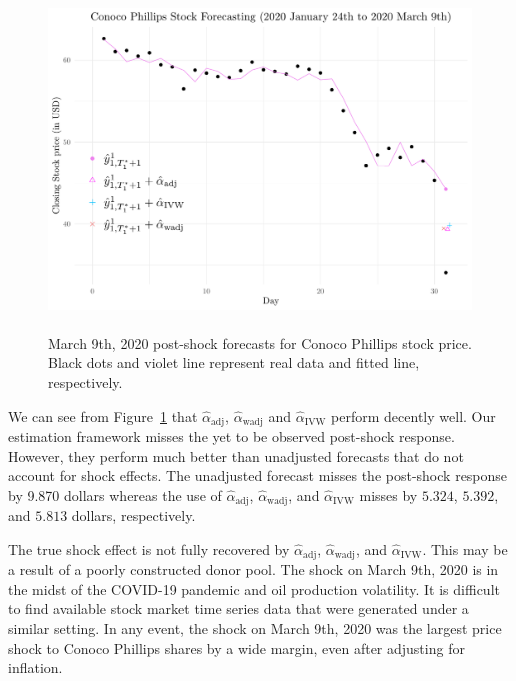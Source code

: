 \documentclass[11pt,3p,review,authoryear]{elsarticle}
\theoremstyle{definition}
\begin{document}
\begin{figure}[t!]
  \begin{center}
    \includegraphics[height = 9cm]{FIG2.pdf}
    \caption{March 9th, 2020 post-shock forecasts for Conoco Phillips stock price. Black dots and violet line represent real data and fitted line, respectively.}
    \label{Fig:CP}
  \end{center}  
  \vspace{-.6cm}
\end{figure}


We can see from Figure~\ref{Fig:CP} that $\hat{\alpha}_{\text{adj}}$, $\hat{\alpha}_{\text{wadj}}$ and $\hat{\alpha}_{\text{IVW}}$ perform decently well. Our estimation framework misses the yet to be observed post-shock response. However, they perform much better than unadjusted forecasts that do not account for shock effects. The unadjusted forecast misses the post-shock response by 9.870 dollars whereas 
the use of $\hat{\alpha}_{\text{adj}}$, $\hat{\alpha}_{\text{wadj}}$, and $\hat{\alpha}_{\text{IVW}}$ misses by $5.324$, $5.392$, and $5.813$ dollars, respectively. 

The true shock effect is not fully recovered by $\hat{\alpha}_{\text{adj}}$, $\hat{\alpha}_{\text{wadj}}$, and $\hat{\alpha}_{\text{IVW}}$. This may be a result of a poorly constructed donor pool. The shock on March 9th, 2020 is in the midst of the COVID-19 pandemic and oil production volatility. It is difficult to find available stock market time series data that were generated under a similar setting. In any event, the shock on March 9th, 2020 was the largest price shock to Conoco Phillips shares by a wide margin, even after adjusting for inflation.
\end{document}
